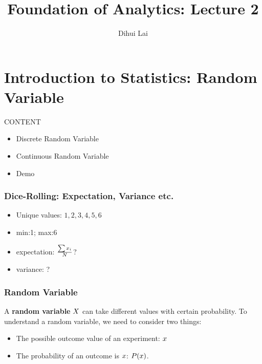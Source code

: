 \documentclass[notheorems, aspectratio=54]{beamer}
\title{Foundation of Analytics: Lecture 2}
\author{Dihui Lai}
\institute[WUSTL]{dlai@wustl.edu}
\def\parchmentframe#1{
\tikz{
  \node[inner sep=2em] (A) {#1};  %
  \begin{pgfonlayer}{background}  %
  \fill[normal border] 
        (A.south east) -- (A.south west) -- 
        (A.north west) -- (A.north east) -- cycle;
  \end{pgfonlayer}}}
\def\parchmentframetop#1{
\tikz{
  \node[inner sep=2em] (A) {#1};    %
  \begin{pgfonlayer}{background}    
  \fill[normal border]              %
        (A.south east) -- (A.south west) -- 
        (A.north west) -- (A.north east) -- cycle;
  \fill[torn border]                %
        ($(A.south east)-(0,.2)$) -- ($(A.south west)-(0,.2)$) -- 
        ($(A.south west)+(0,.2)$) -- ($(A.south east)+(0,.2)$) -- cycle;
  \end{pgfonlayer}}}
\def\parchmentframebottom#1{
\tikz{
  \node[inner sep=2em] (A) {#1};   %
  \begin{pgfonlayer}{background}   
  \fill[normal border]             %
        (A.south east) -- (A.south west) -- 
        (A.north west) -- (A.north east) -- cycle;
  \fill[torn border]               %
        ($(A.north east)-(0,.2)$) -- ($(A.north west)-(0,.2)$) -- 
        ($(A.north west)+(0,.2)$) -- ($(A.north east)+(0,.2)$) -- cycle;
  \end{pgfonlayer}}}
\def\parchmentframemiddle#1{
\tikz{
  \node[inner sep=2em] (A) {#1};   %
  \begin{pgfonlayer}{background}   
  \fill[normal border]             %
        (A.south east) -- (A.south west) -- 
        (A.north west) -- (A.north east) -- cycle;
  \fill[torn border]               %
        ($(A.south east)-(0,.2)$) -- ($(A.south west)-(0,.2)$) -- 
        ($(A.south west)+(0,.2)$) -- ($(A.south east)+(0,.2)$) -- cycle;
  \fill[torn border]               %
        ($(A.north east)-(0,.2)$) -- ($(A.north west)-(0,.2)$) -- 
        ($(A.north west)+(0,.2)$) -- ($(A.north east)+(0,.2)$) -- cycle;
  \end{pgfonlayer}}}
\newenvironment{parchment}[1][Example]{%
  \def\FrameCommand{\parchmentframe}%
  \def\FirstFrameCommand{\parchmentframetop}%
  \def\LastFrameCommand{\parchmentframebottom}%
  \def\MidFrameCommand{\parchmentframemiddle}%
  \vskip\baselineskip
  \MakeFramed {\FrameRestore}
  \noindent\tikz\node[inner sep=1ex, draw=black!20,fill=white, 
          anchor=west, overlay] at (0em, 2em) {\sffamily#1};\par}%
{\endMakeFramed}
\begin{document}
\begin{frame}
    \titlepage
\end{frame}

\section{Introduction to Statistics: Random Variable}
\begin{frame}
CONTENT
\begin{itemize}
\item Discrete Random Variable 
\item Continuous Random Variable
\item Demo
\end{itemize}
\end{frame}




\begin{frame}
\frametitle{Dice-Rolling: Expectation, Variance etc.}
\begin{itemize}
\item Unique values: $1, 2, 3, 4, 5, 6$
\item min:1; max:6
\item expectation: $\frac{\sum{\mathnormal{x_i}}}{\mathnormal{N}}$?
\item variance: ?

\end{itemize}

\end{frame}

\begin{frame}
\frametitle{Random Variable}

A \textbf{random variable} $\mathnormal{X}$  can take different values with certain probability. To understand a random variable, we need to consider two things: 
\begin{itemize}
\item The possible outcome value of an experiment: $\mathnormal{x}$ 
\item The probability of an outcome is $\mathnormal{x}$: $\mathnormal{P(x)}$.

\end{itemize}

\end{frame}
\end{document}
